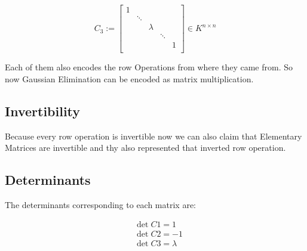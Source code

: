 \[
       C_3 := 
       \begin{bmatrix}
       1      &        &        &        &        \\
              & \ddots &        &        &        \\
              &        & \lambda &       &        \\
              &        &        & \ddots &        \\
              &        &        &        & 1      \\
       \end{bmatrix}
       \in K^{n \times n}
\]

Each of them also encodes the row Operations from where they came from.
So now Gaussian Elimination can be encoded as matrix multiplication.

\subsection{Invertibility}

Because every row operation is invertible now we can also claim that
Elementary Matrices are invertible and thy also represented that inverted row operation.

\subsection{Determinants}

The determinants corresponding to each matrix are:

\begin{align*}
       &\det C1 = 1\\
       &\det C2 = -1\\
       &\det C3 = \lambda
\end{align*}

